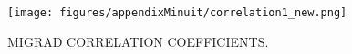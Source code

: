 %

\begin{figure}[!ht]
\begin{center}

    \texttt{[image: figures/appendixMinuit/correlation1\_new.png]}

  \caption{MIGRAD CORRELATION COEFFICIENTS.}

  \label{correlationMatrix}
\end{center}
\end{figure}

